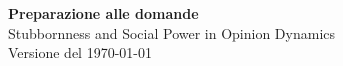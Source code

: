 \documentclass[a4paper,10pt]{article}
\newcommand{\fr}[1]{\getrefnumber{P-#1}}      %
\newcommand{\uno}{\mathbf{1}}
\begin{document}
\begin{center}
  {\LARGE\bfseries Preparazione alle domande}\\[3pt]
  {\large Stubbornness and Social Power in Opinion Dynamics}\\[2pt]
  {\small\color{gray} Versione del \today}
\end{center}

%
%
\end{document}
